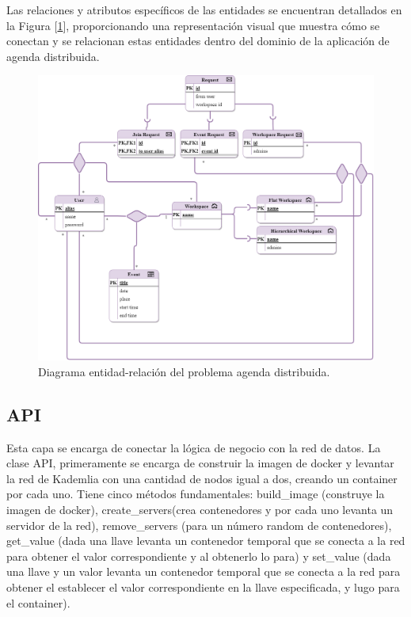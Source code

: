 \documentclass[10pt]{article} %
\begin{document}
	Las relaciones y atributos específicos de las entidades  se encuentran detallados en la Figura [\ref{merx}], proporcionando una representación visual que muestra cómo se conectan y se relacionan estas entidades dentro del dominio de la aplicación de agenda distribuida.
	


	\begin{center}
		\begin{figure}[h]
			\includegraphics[scale=0.35]{modelo-merx}
			\caption{Diagrama entidad-relaci\'on del problema agenda distribuida.}
			\label{merx}
		\end{figure}
		
	\end{center}

	 
	\subsection{API}
	
	Esta capa se encarga de conectar la l\'ogica de negocio con la red de datos. La clase API, primeramente se encarga de construir la imagen de docker y levantar la red de Kademlia con una cantidad de nodos igual a dos, creando un container por cada uno. Tiene cinco m\'etodos fundamentales: build\_image (construye la imagen de docker), create\_servers(crea contenedores y por cada uno levanta un servidor de la red), remove\_servers (para un n\'umero random de contenedores), get\_value (dada una llave levanta un contenedor temporal que se conecta a la red para obtener el valor correspondiente y al obtenerlo lo para) y set\_value (dada una llave y un valor levanta un contenedor temporal que se conecta a la red para obtener el establecer el valor correspondiente en la llave especificada, y lugo para el container).
	
\end{document}

